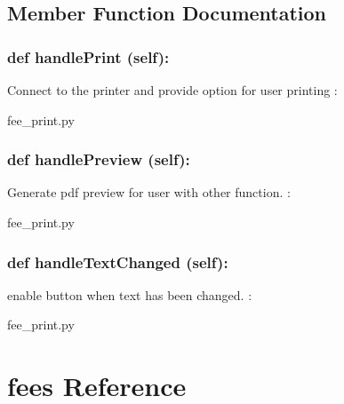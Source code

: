 \subsection{Member Function Documentation}
\hypertarget{class_poly_a14a7ad77ce612b0c54f531d307ee4b39}{
\subsubsection[{def handlePrint (self):}]{\setlength{\rightskip}{0pt plus 5cm}def {handlePrint} (self):}}\label{class_poly_a14a7ad77ce612b0c54f531d307ee4b39}
Connect to the printer and provide option for user printing
:\begin{DoxyCompactItemize}
\item 
fee\_print.\-py\end{DoxyCompactItemize}

\hypertarget{class_poly_a14a7ad77ce612b0c54f531d307ee4b39}{
\subsubsection[{def handlePreview (self):}]{\setlength{\rightskip}{0pt plus 5cm}def {handlePreview} (self):}}\label{class_poly_a14a7ad77ce612b0c54f531d307ee4b39}
Generate pdf preview for user with other function.
:\begin{DoxyCompactItemize}
\item 
fee\_print.\-py\end{DoxyCompactItemize}

\hypertarget{class_poly_a14a7ad77ce612b0c54f531d307ee4b39}{
\subsubsection[{def handleTextChanged (self):}]{\setlength{\rightskip}{0pt plus 5cm}def {handleTextChanged} (self):}}\label{class_poly_a14a7ad77ce612b0c54f531d307ee4b39}
enable button when text has been changed.
:\begin{DoxyCompactItemize}
\item 
fee\_print.\-py\end{DoxyCompactItemize}

\hypertarget{fees}{\section{fees Reference}
\label{fees}
}
